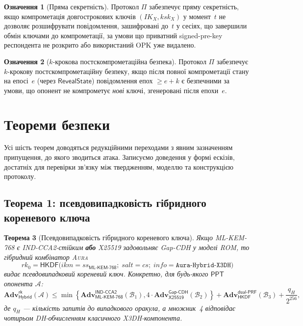 \documentclass[11pt,a4paper]{article}
\newtheorem{theorem}{Теорема}[section]
\theoremstyle{definition}
\newtheorem{definition}[theorem]{Означення}
\newcommand{\ppt}{\ensuremath{\mathsf{PPT}}}
\newcommand{\adv}{\ensuremath{\mathbf{Adv}}}
\newcommand{\advA}{\ensuremath{\mathcal{A}}}
\newcommand{\advB}{\ensuremath{\mathcal{B}}}
\newcommand{\HKDF}{\textsf{HKDF}}
\renewcommand{\DH}{\textsf{X25519}}
\newcommand{\KEM}{\textsf{ML-KEM-768}}
\newcommand{\GapCDH}{\textsf{Gap-CDH}}
\newcommand{\INDCCA}{\textsf{IND-CCA2}}
\newcommand{\dualPRF}{\textsf{dual-PRF}}
\newcommand{\ROM}{\textsf{ROM}}
\newcommand{\rk}{\ensuremath{\mathit{rk}}}
\newcommand{\IK}{\ensuremath{\mathit{IK}}}
\newcommand{\Aura}{\mbox{\normalfont\scshape Aura}}
\begin{document}
\begin{definition}[Пряма секретність]\label{def:fs}
Протокол $\Pi$ забезпечує пряму секретність, якщо компрометація
довгострокових ключів $(\IK_X, \mathit{ksk}_X)$ у момент~$t$ не
дозволяє розшифрувати повідомлення, зашифровані до~$t$ у сесіях,
що завершили обмін ключами до компрометації, за умови що приватний
signed-pre-key респондента не розкрито або використаний OPK уже видалено.
\end{definition}

\begin{definition}[$k$-крокова постскомпрометаційна
безпека]\label{def:pcs}
Протокол $\Pi$ забезпечує $k$-крокову постскомпрометаційну безпеку,
якщо після повної компрометації стану на епосі~$e$ (через
$\mathsf{RevealState}$) повідомлення епох $\ge e + k$ є безпечними
за умови, що опонент не компрометує \emph{нові} ключі, згенеровані
після епохи~$e$.
\end{definition}

\section{Теореми безпеки}\label{sec:theorems}

Усі шість теорем доводяться редукційними переходами з явним зазначенням
припущення, до якого зводиться атака. Записуємо доведення у формі
ескізів, достатніх для перевірки зв'язку між твердженням, моделлю та
конструкцією протоколу.

\subsection{Теорема 1: псевдовипадковість гібридного кореневого ключа}\label{sec:thm1}

\begin{theorem}[Псевдовипадковість гібридного кореневого ключа]\label{thm:combiner}
Якщо \KEM{} є \INDCCA{}-стійким \textbf{або} \DH{} задовольняє
\GapCDH{} у моделі \ROM{}, то гібридний комбінатор \Aura{}
\begin{equation}\label{eq:combiner-root}
  \rk_0 = \HKDF\big(\mathit{ikm} = \mathit{ss}_{\KEM};\;
    \mathit{salt} = \mathit{cs};\;
    \mathit{info} = \texttt{Aura-Hybrid-X3DH}\big)
\end{equation}
видає псевдовипадковий кореневий ключ. Конкретно, для будь-якого
\ppt{} опонента $\advA$:
\begin{equation}\label{eq:combiner-bound}
  \adv^{\mathsf{rk}}_{\mathsf{Hybrid}}(\advA)
  \le
  \min\!\left\{
    \adv^{\INDCCA}_{\KEM}(\advB_1),
    4 \cdot \adv^{\GapCDH}_{\DH}(\advB_2)
  \right\}
  + \adv^{\dualPRF}_{\HKDF}(\advB_3)
  + \frac{q_H}{2^{256}},
\end{equation}
де $q_H$ — кількість запитів до випадкового оракула, а множник~4
відповідає чотирьом DH-обчисленням класичного X3DH-компонента.
\end{theorem}
\end{document}
